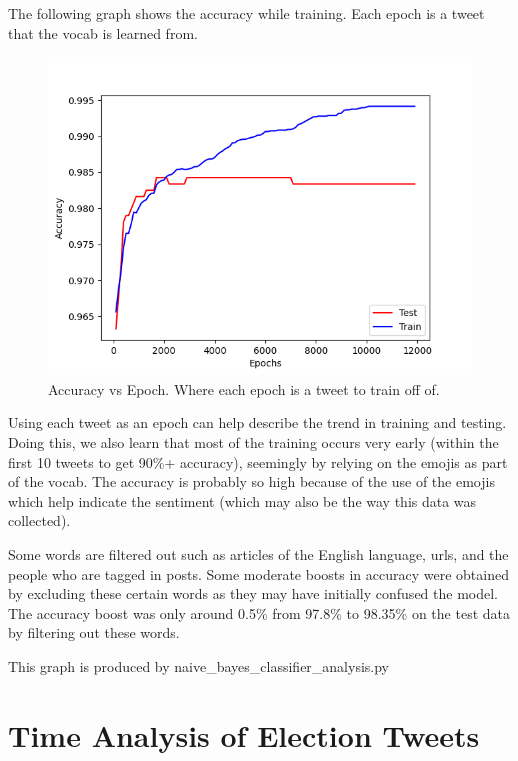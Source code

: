 \documentclass{article}
\begin{document}
The following graph shows the accuracy while training. Each epoch is a tweet that the vocab is learned from. 

\begin{figure}[h!]
    \centering
    \includegraphics[width=1\linewidth]{plots/Epoch_Accuracy.png}
    \caption*{Accuracy vs Epoch. Where each epoch is a tweet to train off of.}
\end{figure}    

\noindent Using each tweet as an epoch can help describe the trend in training and testing. Doing this, we also learn that most of the training occurs very early (within the first 10 tweets to get 90\%+ accuracy), seemingly by relying on the emojis as part of the vocab. The accuracy is probably so high because of the use of the emojis which help indicate the sentiment (which may also be the way this data was collected). 

\noindent Some words are filtered out such as articles of the English language, urls, and the people who are tagged in posts. Some moderate boosts in accuracy were obtained by excluding these certain words as they may have initially confused the model. The accuracy boost was only around 0.5\%  from 97.8\% to 98.35\% on the test data by filtering out these words.  

\noindent This graph is produced by naive\_bayes\_classifier\_analysis.py

\section{Time Analysis of Election Tweets}
\end{document}
